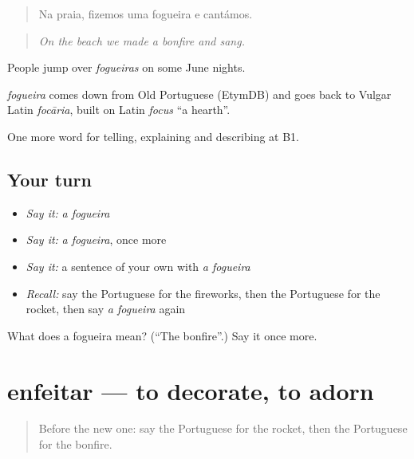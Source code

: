 \begin{quote}
Na praia, fizemos uma fogueira e cantámos.
\end{quote}

\begin{quote}
\emph{On the beach we made a bonfire and sang.}
\end{quote}

People jump over \emph{fogueiras} on some June nights.

\begin{cousinweb}
\emph{fogueira} comes down from Old Portuguese (EtymDB) and goes back to Vulgar Latin \emph{focāria}, built on Latin \emph{focus} \textquotedblleft{}a hearth\textquotedblright{}.
\end{cousinweb}

\begin{grammarlens}[title={What you've built}]
One more word for telling, explaining and describing at B1.
\end{grammarlens}

\subsection*{Your turn}
\begin{itemize}
\raggedright
  \item \emph{Say it:} \emph{a fogueira}
  \item \emph{Say it:} \emph{a fogueira}, once more
  \item \emph{Say it:} a sentence of your own with \emph{a fogueira}
  \item \emph{Recall:} say the Portuguese for the fireworks, then the Portuguese for the rocket, then say \emph{a fogueira} again
\end{itemize}

\begin{tcolorbox}[breakable,colback=teal!4,colframe=teal!35!black,title={Before you move on}]
What does a fogueira mean? (\textquotedblleft{}The bonfire\textquotedblright{}.) Say it once more.
\end{tcolorbox}
\section[enfeitar]{enfeitar — to decorate, to adorn}

\label{lesson:PT-C322-enfeitar}



\begin{quote}
Before the new one: say the Portuguese for the rocket, then the Portuguese for the bonfire.
\end{quote}

